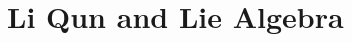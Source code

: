 \chapter{Li Qun and Lie Algebra}
\label{cpt: 4}



\newpage



\newpage


\newpage


\newpage


\newpage


\newpage